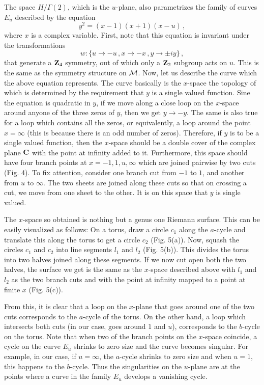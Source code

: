 The space $H/\Gamma(2)$, which is the $u$-plane, also parametrizes the
family of curves $E_u$ described by the equation 
\begin{equation}
y^2 = (x-1)(x+1)(x-u)\,, 
\label{cubic}
\end{equation}
where $x$ is a complex variable. First, note that this equation is
invariant under the transformations  
$$
w:\{u\rightarrow -u\,,x\rightarrow -x\,,y\rightarrow \pm iy \}\,,
$$
that generate a ${\bf Z}_{4}$ symmetry, out of which only a ${\bf
Z}_{2}$ subgroup acts on $u$. This is the same as the symmetry
structure on ${\cal M}$. Now, let us describe the curve which the
above equation represents. The curve basically is the $x$-space the
topology of which is determined by the requirement that $y$ is a
single valued function. Sine the equation is quadratic in $y$, if we
move along a close loop on the $x$-space around anyone of the three
zeros of $y$, then we get $y\rightarrow -y$. The same is also true for
a loop which contains all the zeros, or equivalently, a loop around
the point $x=\infty$ (this is because there is an odd number of
zeros).  Therefore, if $y$ is to be a single valued function, then the
$x$-space should be a double cover of the complex plane ${\bf C}$ with
the point at infinity added to it. Furthermore, this space should have
four branch points at $x=-1,1,u,\infty$ which are joined pairwise by
two cuts (Fig. 4). To fix attention, consider one branch cut from $-1$
to $1$, and another from $u$ to $\infty$. The two  sheets are joined
along these cuts so that on crossing a cut, we move from one sheet to
the other. It is on this space that $y$ is single valued.


The $x$-space so obtained is nothing but a genus one Riemann
surface. This can be easily visualized as follows: On a torus, draw a
circle $c_1$ along the $a$-cycle and translate this along the torus to
get a circle $c_2$ (Fig. 5(a)). Now, squash the circles $c_1$ and
$c_2$ into line segments $l_1$ and $l_2$ (Fig. 5(b)). This divides the
torus into two halves joined along these segments. If we now cut open
both the two halves, the surface we get is the same as the $x$-space
described above with $l_1$ and $l_2$ as the two branch cuts and with
the point at infinity mapped to a point at finite $x$ (Fig. 5(c)).


From this, it is clear that a loop on the $x$-plane that goes around
one of the two cuts corresponds to the $a$-cycle of the torus. On the
other hand, a loop which intersects both cuts (in our case, goes
around $1$ and $u$), corresponds to the $b$-cycle on the torus.
Note that when two of the branch points on the $x$-space coincide, a
cycle on the curve $E_u$ shrinks to zero size and the curve becomes
singular. For example, in our case, if $u=\infty$, the $a$-cycle 
shrinks to zero size and when $u=1$, this happens to the $b$-cycle.
Thus the singularities on the $u$-plane are at the points where a
curve in the family $E_u$ develops a vanishing cycle.

